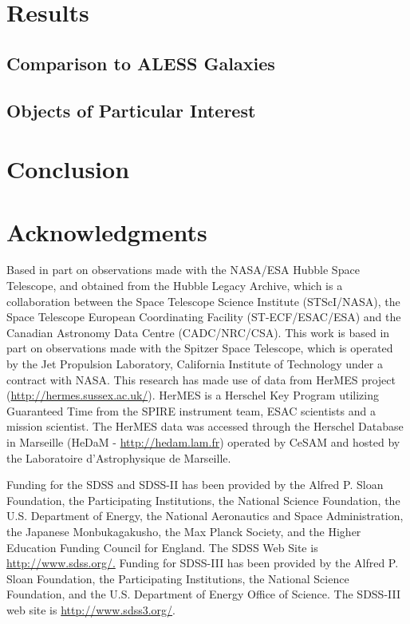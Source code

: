 \documentclass[preprint,natbib209]{aastex}
\begin{document}
\section{Results}
\label{sec:discussion}



\subsection{Comparison to ALESS Galaxies}



\subsection{Objects of Particular Interest}



\section{Conclusion}
\label{sec:conclusion}



\acknowledgments
\section*{Acknowledgments}
Based in part on observations made with the NASA/ESA Hubble Space Telescope, 
and obtained from the Hubble Legacy Archive, which is a collaboration between
the Space Telescope Science Institute (STScI/NASA), the Space Telescope 
European Coordinating Facility (ST-ECF/ESAC/ESA) and the 
Canadian Astronomy Data Centre (CADC/NRC/CSA). 
This work is based in part on observations made with the Spitzer Space Telescope, 
which is operated by the Jet Propulsion Laboratory, California Institute of Technology under a contract with NASA.
This research has made use of data from HerMES project (\url{http://hermes.sussex.ac.uk/}). 
HerMES is a Herschel Key Program utilizing Guaranteed Time from the SPIRE instrument team,
ESAC scientists and a mission scientist.
The HerMES data was accessed through the Herschel Database in 
Marseille (HeDaM - \url{http://hedam.lam.fr}) operated by CeSAM and
hosted by the Laboratoire d'Astrophysique de Marseille.

Funding for the SDSS and SDSS-II has been provided by the Alfred P. Sloan Foundation, 
the Participating Institutions, the National Science Foundation, the U.S. Department of Energy, 
the National Aeronautics and Space Administration, the Japanese Monbukagakusho, 
the Max Planck Society, and the Higher Education Funding Council for England. 
The SDSS Web Site is \url{http://www.sdss.org/.}
Funding for SDSS-III has been provided by the Alfred P. Sloan Foundation, the Participating Institutions, 
the National Science Foundation, and the U.S. Department of Energy Office of Science. 
The SDSS-III web site is \url{http://www.sdss3.org/}.
\end{document}
